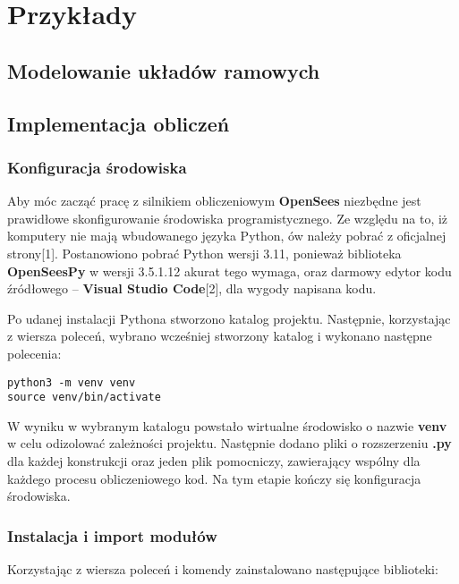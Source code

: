 \newpage
\section{Przykłady}

\subsection{Modelowanie układów ramowych}

\subsection{Implementacja obliczeń}
\subsubsection{Konfiguracja środowiska}

Aby móc zacząć pracę z silnikiem obliczeniowym \textbf{OpenSees} niezbędne jest prawidłowe skonfigurowanie środowiska programistycznego.
Ze względu na to, iż komputery nie mają wbudowanego języka Python, ów należy pobrać z oficjalnej strony[1].
Postanowiono pobrać Python wersji 3.11, ponieważ biblioteka \textbf{OpenSeesPy} w wersji 3.5.1.12 akurat tego wymaga,
oraz darmowy edytor kodu źródłowego – \textbf{Visual Studio Code}[2], dla wygody napisana kodu.

Po udanej instalacji Pythona stworzono katalog projektu.
Następnie, korzystając z wiersza poleceń, wybrano wcześniej stworzony katalog i wykonano następne polecenia:

\begin{lstlisting}
python3 -m venv venv
source venv/bin/activate
\end{lstlisting}

W wyniku w wybranym katalogu powstało wirtualne środowisko o nazwie \textbf{venv} w celu odizolować zależności projektu.
Następnie dodano pliki o rozszerzeniu \textbf{.py} dla każdej konstrukcji oraz jeden plik pomocniczy, zawierający wspólny
dla każdego procesu obliczeniowego kod.
Na tym etapie kończy się konfiguracja środowiska.

\subsubsection{Instalacja i import modułów}

Korzystając z wiersza poleceń i komendy  zainstalowano następujące biblioteki:

